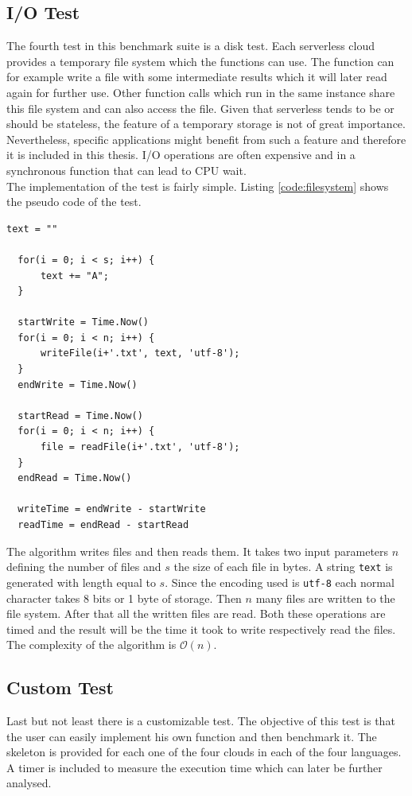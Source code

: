 \subsection{I/O Test}
The fourth test in this benchmark suite is a disk test. Each serverless cloud provides a temporary file system which the functions can use. The function can for example write a file with some intermediate results which it will later read again for further use. Other function calls which run in the same instance share this file system and can also access the file. Given that serverless tends to be or should be stateless, the feature of a temporary storage is not of great importance. Nevertheless, specific applications might benefit from such a feature and therefore it is included in this thesis. I/O operations are often expensive and in a synchronous function that can lead to \gls{CPU} wait.\\
The implementation of the test is fairly simple. Listing \ref{code:filesystem} shows the pseudo code of the test.


\begin{minipage}{\linewidth}
\begin{lstlisting}[frame=single,caption={I/O test pseudo code},label=code:filesystem,linewidth=0.75\textwidth,xleftmargin=.25\textwidth]
  text = ""
    
  for(i = 0; i < s; i++) {
      text += "A";
  }
  
  startWrite = Time.Now()
  for(i = 0; i < n; i++) {
      writeFile(i+'.txt', text, 'utf-8');
  }
  endWrite = Time.Now()
  
  startRead = Time.Now()
  for(i = 0; i < n; i++) {
      file = readFile(i+'.txt', 'utf-8');
  }
  endRead = Time.Now()
  
  writeTime = endWrite - startWrite
  readTime = endRead - startRead
\end{lstlisting}
\end{minipage}
\newline

The algorithm writes files and then reads them. It takes two input parameters $n$ defining the number of files and $s$ the size of each file in bytes. A string \texttt{text} is generated with length equal to $s$. Since the encoding used is \texttt{utf-8} each normal character takes 8 bits or 1 byte of storage. Then $n$ many files are written to the file system. After that all the written files are read. Both these operations are timed and the result will be the time it took to write respectively read the files. The complexity of the algorithm is $\mathcal{O}(n)$.

\subsection{Custom Test}
Last but not least there is a customizable test. The objective of this test is that the user can easily implement his own function and then benchmark it. The skeleton is provided for each one of the four clouds in each of the four languages. A timer is included to measure the execution time which can later be further analysed.